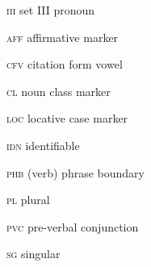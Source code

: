 \documentclass[output=paper]{langsci/langscibook}
\begin{document}
\textsc{iii} set III pronoun

\textsc{aff}  affirmative marker

\textsc{cfv}  citation form vowel

\textsc{cl} noun class marker

\textsc{loc} locative case marker

\textsc{idn} identifiable

\textsc{phb} (verb) phrase boundary

\textsc{pl} plural

\textsc{pvc} pre-verbal conjunction

\textsc{sg} singular



{\sloppy
\printbibliography[heading=subbibliography,notkeyword=this]
}
\end{document}
